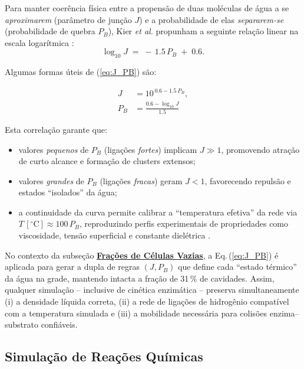 \documentclass[12pt,oneside]{report}
\begin{document}
Para manter coerência física entre a propensão de duas moléculas de água
a se \emph{aproximarem} (parâmetro de junção $J$) e a probabilidade de elas
\emph{separarem-se} (probabilidade de quebra $P_B$), Kier \emph{et al.}
propunham a seguinte relação linear na escala logarítmica \cite{kier2005}:
\begin{equation}
    \label{eq:J_PB}
    \log_{10} J \;=\; -\,1.5\,P_B \;+\; 0.6 .
\end{equation}

Algumas formas úteis de (\ref{eq:J_PB}) são:

\begin{align}
    J   & = 10^{\,0.6 - 1.5\,P_B},                 \\[4pt]
    P_B & = \frac{0.6 - \log_{10} J}{1.5} \tag*{}
\end{align}

Esta correlação garante que:

\begin{itemize}
    \item valores \emph{pequenos} de $P_B$ (ligações \textit{fortes}) implicam
          $J \gg 1$, promovendo atração de curto alcance e formação de clusters
          extensos;
    \item valores \emph{grandes} de $P_B$ (ligações \textit{fracas}) geram
          $J < 1$, favorecendo repulsão e estados “isolados” da água;
    \item a continuidade da curva permite calibrar a ``temperatura efetiva'' da
          rede via $T\,[^{\circ}\mathrm{C}] \approx 100\,P_B$,
          reproduzindo perfis experimentais de propriedades como viscosidade,
          tensão superficial e constante dielétrica \cite{kier2005}.
\end{itemize}

No contexto da subseção \hyperref[subsubsec:fracao_celulas_vazias]{\textbf{Frações de Células Vazias}}, a Eq.\,(\ref{eq:J_PB}) é aplicada
para gerar a dupla de regras $(J,P_B)$ que define cada “estado térmico” da
água na grade, mantendo intacta a fração de 31\,\% de cavidades. Assim,
qualquer simulação – inclusive de cinética enzimática – preserva
simultaneamente (i) a densidade líquida correta, (ii) a rede de ligações de
hidrogênio compatível com a temperatura simulada e (iii) a mobilidade
necessária para colisões enzima–substrato confiáveis.

\subsection{Simulação de Reações Químicas}
\end{document}
